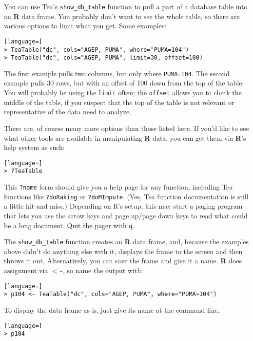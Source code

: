 \documentclass{article}
\begin{document}
You can use Tea's {\tt show\_db\_table} function to pull a part of a database table into
an \textbf{R} data frame. You probably don't want to see the whole table, so there are
various options to limit what you get. Some examples:
\begin{lstlisting}[language=]
> TeaTable("dc", cols="AGEP, PUMA", where="PUMA=104")
> TeaTable("dc", cols="AGEP, PUMA", limit=30, offset=100)
\end{lstlisting}

The first example pulls two columns, but only where {\tt PUMA=104}. The second
example pulls 30 rows, but with an offset of 100 down from the top of the
table. You will probably be using the {\tt limit} often; the {\tt offset} allows
you to check the middle of the table, if you suspect that the top of the table
is not relevant or representative of the data need to analyze.

There are, of course many more options than those listed here. If you'd like to see what other tools are available in manipulating \textbf{R} data, you can get them via \textbf{R}'s help system as such:
\begin{lstlisting}[language=]
> ?TeaTable
\end{lstlisting}

This {\tt ?name} form should give you a help page for any function, including Tea
functions like {\tt ?doRaking} or {\tt ?doMImpute}. (Yes, Tea function documentation is still a
little hit-and-miss.) Depending on R's setup, this may start a paging program that lets 
you use the arrow keys and page up/page down keys to read what could be a long document. 
Quit the pager with {\tt q}.

The {\tt show\_db\_table} function creates an \textbf{R} data frame, and, because the examples above didn't do
anything else with it, displays the frame to the screen and then throws it out. Alternatively, you can
save the frame and give it a name. \textbf{R} does assignment via {\tt $<$-}, so name the output
with:

\begin{lstlisting}[language=]
> p104 <- TeaTable("dc", cols="AGEP, PUMA", where="PUMA=104")
\end{lstlisting}

To display the data frame as is, just give its name at the command line.

\begin{lstlisting}[language=]
> p104
\end{lstlisting}
\end{document}
